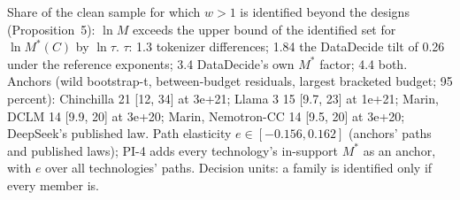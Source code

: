 \begin{table}[tp]
\begin{tabular}{@{}lrrrrrcrrrrr@{}}
\bottomrule
\end{tabular}
\medskip
\begin{tablenotes}
Share of the clean sample for which $w>1$ is identified beyond the designs (Proposition~5): $\ln M$ exceeds the upper bound of the identified set for $\ln M^*(C)$ by $\ln\tau$. $\tau$: 1.3 tokenizer differences; 1.84 the DataDecide tilt of 0.26 under the reference exponents; 3.4 DataDecide's own $M^*$ factor; 4.4 both. Anchors (wild bootstrap-t, between-budget residuals, largest bracketed budget; 95 percent): Chinchilla 21 [12, 34] at 3e+21; Llama 3 15 [9.7, 23] at 1e+21; Marin, DCLM 14 [9.9, 20] at 3e+20; Marin, Nemotron-CC 14 [9.5, 20] at 3e+20; DeepSeek's published law. Path elasticity $e\in[-0.156, 0.162]$ (anchors' paths and published laws); PI-4 adds every technology's in-support $M^*$ as an anchor, with $e$ over all technologies' paths. Decision units: a family is identified only if every member is.
\end{tablenotes}
\end{table}
